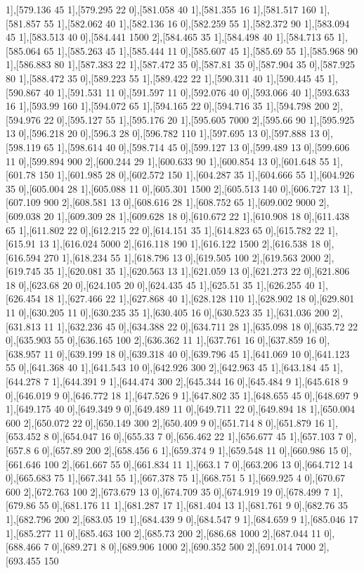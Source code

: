 {1],[579.136 45 1],[579.295 22 0],[581.058 40 1],[581.355 16 1],[581.517 160 1],[581.857 55 1],[582.062 40 1],[582.136 16 0],[582.259 55 1],[582.372 90 1],[583.094 45 1],[583.513 40 0],[584.441 1500 2],[584.465 35 1],[584.498 40 1],[584.713 65 1],[585.064 65 1],[585.263 45 1],[585.444 11 0],[585.607 45 1],[585.69 55 1],[585.968 90 1],[586.883 80 1],[587.383 22 1],[587.472 35 0],[587.81 35 0],[587.904 35 0],[587.925 80 1],[588.472 35 0],[589.223 55 1],[589.422 22 1],[590.311 40 1],[590.445 45 1],[590.867 40 1],[591.531 11 0],[591.597 11 0],[592.076 40 0],[593.066 40 1],[593.633 16 1],[593.99 160 1],[594.072 65 1],[594.165 22 0],[594.716 35 1],[594.798 200 2],[594.976 22 0],[595.127 55 1],[595.176 20 1],[595.605 7000 2],[595.66 90 1],[595.925 13 0],[596.218 20 0],[596.3 28 0],[596.782 110 1],[597.695 13 0],[597.888 13 0],[598.119 65 1],[598.614 40 0],[598.714 45 0],[599.127 13 0],[599.489 13 0],[599.606 11 0],[599.894 900 2],[600.244 29 1],[600.633 90 1],[600.854 13 0],[601.648 55 1],[601.78 150 1],[601.985 28 0],[602.572 150 1],[604.287 35 1],[604.666 55 1],[604.926 35 0],[605.004 28 1],[605.088 11 0],[605.301 1500 2],[605.513 140 0],[606.727 13 1],[607.109 900 2],[608.581 13 0],[608.616 28 1],[608.752 65 1],[609.002 9000 2],[609.038 20 1],[609.309 28 1],[609.628 18 0],[610.672 22 1],[610.908 18 0],[611.438 65 1],[611.802 22 0],[612.215 22 0],[614.151 35 1],[614.823 65 0],[615.782 22 1],[615.91 13 1],[616.024 5000 2],[616.118 190 1],[616.122 1500 2],[616.538 18 0],[616.594 270 1],[618.234 55 1],[618.796 13 0],[619.505 100 2],[619.563 2000 2],[619.745 35 1],[620.081 35 1],[620.563 13 1],[621.059 13 0],[621.273 22 0],[621.806 18 0],[623.68 20 0],[624.105 20 0],[624.435 45 1],[625.51 35 1],[626.255 40 1],[626.454 18 1],[627.466 22 1],[627.868 40 1],[628.128 110 1],[628.902 18 0],[629.801 11 0],[630.205 11 0],[630.235 35 1],[630.405 16 0],[630.523 35 1],[631.036 200 2],[631.813 11 1],[632.236 45 0],[634.388 22 0],[634.711 28 1],[635.098 18 0],[635.72 22 0],[635.903 55 0],[636.165 100 2],[636.362 11 1],[637.761 16 0],[637.859 16 0],[638.957 11 0],[639.199 18 0],[639.318 40 0],[639.796 45 1],[641.069 10 0],[641.123 55 0],[641.368 40 1],[641.543 10 0],[642.926 300 2],[642.963 45 1],[643.184 45 1],[644.278 7 1],[644.391 9 1],[644.474 300 2],[645.344 16 0],[645.484 9 1],[645.618 9 0],[646.019 9 0],[646.772 18 1],[647.526 9 1],[647.802 35 1],[648.655 45 0],[648.697 9 1],[649.175 40 0],[649.349 9 0],[649.489 11 0],[649.711 22 0],[649.894 18 1],[650.004 600 2],[650.072 22 0],[650.149 300 2],[650.409 9 0],[651.714 8 0],[651.879 16 1],[653.452 8 0],[654.047 16 0],[655.33 7 0],[656.462 22 1],[656.677 45 1],[657.103 7 0],[657.8 6 0],[657.89 200 2],[658.456 6 1],[659.374 9 1],[659.548 11 0],[660.986 15 0],[661.646 100 2],[661.667 55 0],[661.834 11 1],[663.1 7 0],[663.206 13 0],[664.712 14 0],[665.683 75 1],[667.341 55 1],[667.378 75 1],[668.751 5 1],[669.925 4 0],[670.67 600 2],[672.763 100 2],[673.679 13 0],[674.709 35 0],[674.919 19 0],[678.499 7 1],[679.86 55 0],[681.176 11 1],[681.287 17 1],[681.404 13 1],[681.761 9 0],[682.76 35 1],[682.796 200 2],[683.05 19 1],[684.439 9 0],[684.547 9 1],[684.659 9 1],[685.046 17 1],[685.277 11 0],[685.463 100 2],[685.73 200 2],[686.68 1000 2],[687.044 11 0],[688.466 7 0],[689.271 8 0],[689.906 1000 2],[690.352 500 2],[691.014 7000 2],[693.455 150 }
